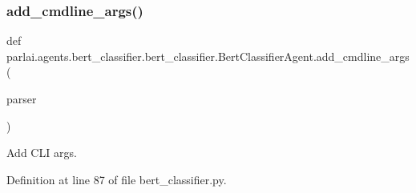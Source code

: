 \subsubsection{\texorpdfstring{add\+\_\+cmdline\+\_\+args()}{add\_cmdline\_args()}}
{\footnotesize\ttfamily def parlai.\+agents.\+bert\+\_\+classifier.\+bert\+\_\+classifier.\+Bert\+Classifier\+Agent.\+add\+\_\+cmdline\+\_\+args (\begin{DoxyParamCaption}\item[{}]{parser }\end{DoxyParamCaption})\hspace{0.3cm}{\ttfamily [static]}}

\begin{DoxyVerb}Add CLI args.
\end{DoxyVerb}
 

Definition at line 87 of file bert\+\_\+classifier.\+py.


